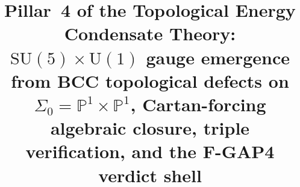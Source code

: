 



\title{Pillar~4 of the Topological Energy Condensate Theory:
$\mathrm{SU}(5)\times\mathrm{U}(1)$ gauge emergence from BCC topological
defects on $\Sigma_0 = \mathbb{P}^1\times\mathbb{P}^1$, Cartan-forcing
algebraic closure, triple verification, and the F-GAP4 verdict shell}

